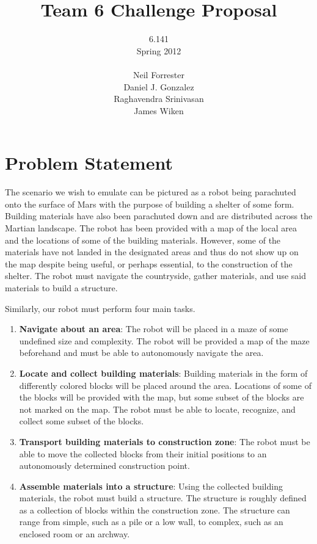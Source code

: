 \documentclass[letterpaper,11pt]{article}
\title{Team 6 Challenge Proposal}
\author{6.141\\
	Spring 2012\\ \\
	Neil Forrester\\
	Daniel J. Gonzalez\\
	Raghavendra Srinivasan\\
	James Wiken}
\begin{document}
\begin{singlespacing}
\maketitle
\thispagestyle{empty}
\newpage

\tableofcontents
\listoffigures
\listoftables
\thispagestyle{empty}
\newpage

\end{singlespacing}

\setcounter{page}{1}

\section{Problem Statement}
The scenario we wish to emulate can be pictured as a robot being parachuted onto the surface of Mars with the purpose of building a shelter of some form.  Building materials have also been parachuted down and are distributed across the Martian landscape.  The robot has been provided with a map of the local area and the locations of some of the building materials.  However, some of the materials have not landed in the designated areas and thus do not show up on the map despite being useful, or perhaps essential, to the construction of the shelter.  The robot must navigate the countryside, gather materials, and use said materials to build a structure.

Similarly, our robot must perform four main tasks.  

\begin{enumerate}
 \item {\bf Navigate about an area}: The robot will be placed in a maze of some undefined size and complexity.  The robot will be provided a map of the maze beforehand and must be able to autonomously navigate the area.
 \item {\bf Locate and collect building materials}: Building materials in the form of differently colored blocks will be placed around the area.  Locations of some of the blocks will be provided with the map, but some subset of the blocks are not marked on the map.  The robot must be able to locate, recognize, and collect some subset of the blocks.
 \item {\bf Transport building materials to construction zone}: The robot must be able to move the collected blocks from their initial positions to an autonomously determined construction point.
 \item {\bf Assemble materials into a structure}: Using the collected building materials, the robot must build a structure.  The structure is roughly defined as a collection of blocks within the construction zone.  The structure can range from simple, such as a pile or a low wall, to complex, such as an enclosed room or an archway.  
\end{enumerate}
\end{document}
